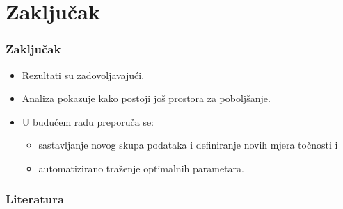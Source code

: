 \documentclass{beamer}
\begin{document}
\section{Zaključak}
\begin{frame}
\frametitle{Zaključak}
\begin{itemize}
    \item Rezultati su zadovoljavajući.
    \item Analiza pokazuje kako postoji još prostora za poboljšanje.
    \item U budućem radu preporuča se:
    \begin{itemize}
        \item sastavljanje novog skupa podataka i definiranje novih mjera točnosti i
        \item automatizirano traženje optimalnih parametara.
    \end{itemize}
\end{itemize}
\end{frame}


\begin{frame}
\frametitle{Literatura}


\end{frame}
\end{document}
